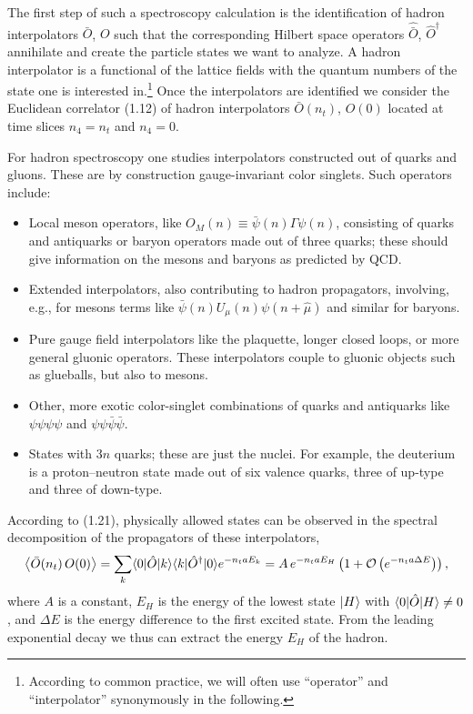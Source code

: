 The first step of such a spectroscopy calculation is the identification of
hadron interpolators $\bar{O}$, $O$ such that the corresponding Hilbert space
operators $\hat{\bar{O}}$, $\hat{O}^\dagger$ annihilate and create the particle
states we want to analyze. A hadron interpolator is a functional of the
lattice fields with the quantum numbers of the state one is interested
in.\footnote{According to common practice, we will often use ``operator'' and
``interpolator'' synonymously in the following.} Once the interpolators are
identified we consider the Euclidean correlator (1.12) of hadron interpolators
$\bar{O}(n_t)$, $O(0)$ located at time slices $n_4 = n_t$ and $n_4 = 0$.

For hadron spectroscopy one studies interpolators constructed out of quarks
and gluons. These are by construction gauge-invariant color singlets. Such
operators include:
\begin{itemize}
  \item Local meson operators, like $O_M(n) \equiv \bar\psi(n)\Gamma\psi(n)$,
        consisting of quarks and antiquarks or baryon operators made out of
        three quarks; these should give information on the mesons and baryons
        as predicted by QCD.
  \item Extended interpolators, also contributing to hadron propagators,
        involving, e.g., for mesons terms like
        $\bar\psi(n)U_\mu(n)\psi(n+\hat\mu)$ and similar for baryons.
  \item Pure gauge field interpolators like the plaquette, longer closed
        loops, or more general gluonic operators. These interpolators couple
        to gluonic objects such as glueballs, but also to mesons.
  \item Other, more exotic color-singlet combinations of quarks and antiquarks
        like $\psi\psi\psi\psi$ and $\psi\psi\bar\psi\bar\psi$.
  \item States with $3n$ quarks; these are just the nuclei. For example, the
        deuterium is a proton--neutron state made out of six valence quarks,
        three of up-type and three of down-type.
\end{itemize}

According to (1.21), physically allowed states can be observed in the spectral
decomposition of the propagators of these interpolators,
\begin{equation}
  \big\langle \bar{O}(n_t)\, O(0) \big\rangle
  = \sum_k \langle0|\hat{O}|k\rangle\langle k|\hat{O}^\dagger|0\rangle e^{-n_t a E_k}
  = A\, e^{-n_t a E_H}\left( 1 + \mathcal{O}\left(e^{-n_t a \Delta E}\right) \right),
\end{equation}
where $A$ is a constant, $E_H$ is the energy of the lowest state $|H\rangle$
with $\langle0|\hat{O}|H\rangle \neq 0$, and $\Delta E$ is the energy difference to
the first excited state. From the leading exponential decay we thus can
extract the energy $E_H$ of the hadron.


